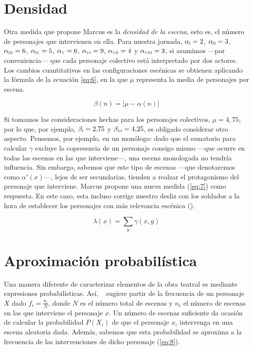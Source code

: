 \section*{Densidad}

Otra medida que propone Marcus es la \textit{densidad de la escena}, esto es, el número de personajes que intervienen en ella. Para nuestra jornada, $\alpha_\textsc{i} = 2$, $\alpha_\textsc{ii} = 3$, $\alpha_\textsc{iii} = 6$,  $\alpha_\textsc{iv} = 5$, $\alpha_\textsc{v} = 6$,  $\alpha_\textsc{vi} = 9$, $ \alpha_\textsc{vii} = 4$ y $\alpha_\textsc{viii} = 3$, si asumimos —\nolinebreak por conveniencia\nolinebreak— que cada personaje colectivo está interpretado por dos actores. Los cambios cuantitativos en las configuraciones escénicas se obtienen aplicando la fórmula de la ecuación \ref{eq:6}, en la que $\mu$ representa la media de personajes por escena.

\begin{equation}\label{eq:6}
	\beta(n) = \lvert \mu - \alpha(n) \rvert
\end{equation}

Si tomamos las consideraciones hechas para los personajes colectivos, $\mu=4{,}75$, por lo que, por ejemplo, $\beta_\textsc{i} = 2{,}75$ y $\beta_\textsc{vi} = 4{,}25$, es obligado considerar otro aspecto. Pensemos, por ejemplo, en un monólogo: dado que el sumatorio para calcular $\gamma$ excluye la copresencia de un personaje consigo mismo —\nolinebreak que ocurre en todas las escenas en las que interviene\nolinebreak—, una escena monologada no tendría influencia. Sin embargo, sabemos que este tipo de escenas —\nolinebreak que denotaremos como $\alpha'(x)$\nolinebreak—\nolinebreak, lejos de ser secundarias, tienden a realzar el protagonismo del personaje que interviene. Marcus propone una nueva medida (\ref{eq:7}) como respuesta. En este caso, esta incluso corrige nuestro desliz con los soldados a la hora de establecer los personajes con más relevancia escénica ().

\begin{equation}\label{eq:7}
	\lambda(x) = \sum_{y}{\gamma(x,y)}
\end{equation}

\section*{Aproximación probabilística}
Una manera diferente de caracterizar elementos de la obra teatral es mediante expresiones probabilísticas. Así, \citeauthor{dinu1968}~\parencite*{dinu1968} sugiere partir de la frecuencia de un personaje $X$ dado $f_i = \frac{n_i}{N}$, donde $N$ es el número total de escenas y $n_i$ el número de escenas en las que interviene el personaje $x$. Un número de escenas suficiente da ocasión de calcular la probabilidad $P(X_i)$ de que el personaje $x_i$ intervenga en una escena aleatoria dada. Además, sabemos que esta probabilidad se aproxima a la frecuencia de las intervenciones de dicho personaje (\ref{eq:8}). 

